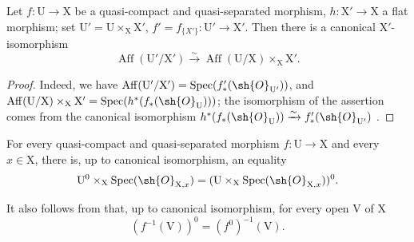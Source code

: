 \begin{proposition}[21.12.2]
\label{IV.21.12.2}
Let $f:\mathrm{U}\to\mathrm{X}$ be a quasi-compact and quasi-separated morphism, $h:\mathrm{X}'\to\mathrm{X}$ a flat morphism; set $\mathrm{U}'=\mathrm{U}\times_{\mathrm{X}}\mathrm{X}'$, $f'=f_{\{X'\}}:\mathrm{U}'\to\mathrm{X}'$.
Then there is a canonical $\mathrm{X}'$-isomorphism
\[
\label{IV.21.12.2.1}
  \operatorname{Aff}(\mathrm{U}'/\mathrm{X}')\xrightarrow{\sim}\operatorname{Aff}(\mathrm{U}/\mathrm{X})\times_{\mathrm{X}}\mathrm{X}'.
  \tag{21.12.2.1}
\]
\end{proposition}

\begin{proof}
Indeed, we have $\operatorname{Aff}(\mathrm{U}'/\mathrm{X}')=\operatorname{Spec}(f'_*(\sh{O}_{\mathrm{U}'}))$, and $\operatorname{Aff}(\mathrm{U}/\mathrm{X})\times_{\mathrm{X}}\mathrm{X}'=\operatorname{Spec}(h^*(f_*(\sh{O}_{\mathrm{U}})))$; the isomorphism of the assertion comes from the canonical isomorphism $h^*(f_*(\sh{O}_{\mathrm{U}}))\xrightarrow{\sim}f'_*(\sh{O}_{\mathrm{U}'})$ .
\end{proof}

\begin{corollary}[21.12.3]
\label{IV.21.12.3}
For every quasi-compact and quasi-separated morphism $f:\mathrm{U}\to\mathrm{X}$ and every $x\in\mathrm{X}$, there is, up to canonical isomorphism, an equality
\[
  \mathrm{U}^0\times_{\mathrm{X}}\operatorname{Spec}(\sh{O}_{\mathrm{X},x})=(\mathrm{U}\times_{\mathrm{X}}\operatorname{Spec}(\sh{O}_{\mathrm{X},x}))^0.
\]
\end{corollary}

It also follows from  that, up to canonical isomorphism, for every open $\mathrm{V}$ of $\mathrm{X}$
\[
\label{IV.21.12.4}
  (f^{-1}(\mathrm{V}))^0=(f^0)^{-1}(\mathrm{V}).
  \tag{21.12.4}
\]


